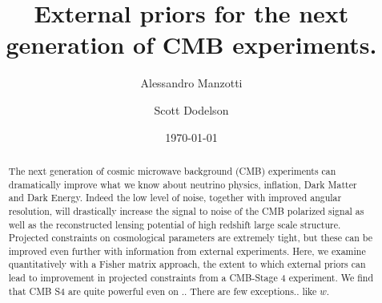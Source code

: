 \documentclass[aps,prd,reprint,superscriptaddress]{revtex4-1}
\begin{document}
\graphicspath{{images/}}

\title{External priors for the next generation of CMB experiments.}

\author{Alessandro Manzotti}
\author{Scott Dodelson}


\date{\today}
\begin{abstract}
The next generation of cosmic microwave background (CMB) experiments can dramatically improve what we know about neutrino physics, inflation, Dark Matter and Dark Energy. 
Indeed the low level of noise, together with improved angular resolution, will drastically increase the signal to noise of the CMB polarized signal as well as the reconstructed lensing potential of high redshift large scale structure. 
Projected constraints on cosmological parameters are extremely tight, but these can be improved even further with information from external experiments. Here, we examine quantitatively with a Fisher matrix approach, the extent to which external priors can lead to improvement in projected constraints from a CMB-Stage 4 experiment.
We find that CMB S4 are quite powerful even on .. There are few exceptions.. like $w$.
\end{abstract}

\pacs{}
\maketitle
\end{document}
